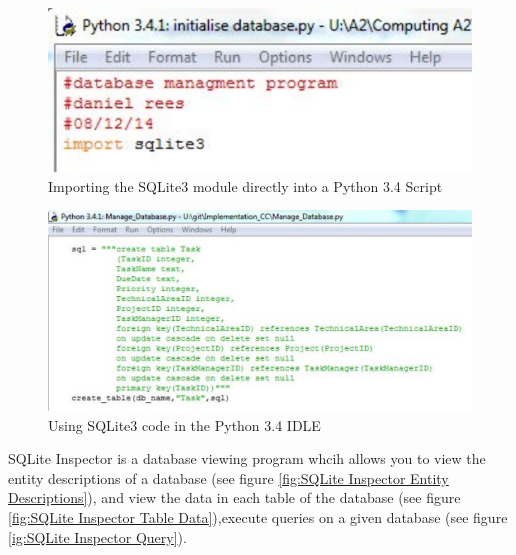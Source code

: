 \begin{figure}[H]
    \includegraphics[width=\textwidth]{./Maintenance/Import_SQLite3.pdf}
    \caption{Importing the SQLite3 module directly into a Python 3.4 Script} \label{fig:Import SQLite3 into Python 3.4}
\end{figure}
\begin{figure}[H]
    \includegraphics[width=\textwidth]{./Maintenance/Example_SQLite3_Code.pdf}
    \caption{Using SQLite3 code in the Python 3.4 IDLE} \label{fig:Example SQLite3 code in Python 3.4}
\end{figure}

SQLite Inspector is a database viewing program whcih allows you to view the entity descriptions of a database (see figure \ref{fig:SQLite Inspector Entity Descriptions}), and view the data in each table of the database (see figure \ref{fig:SQLite Inspector Table Data}),execute queries on a given database (see figure \ref{ig:SQLite Inspector Query}). 

